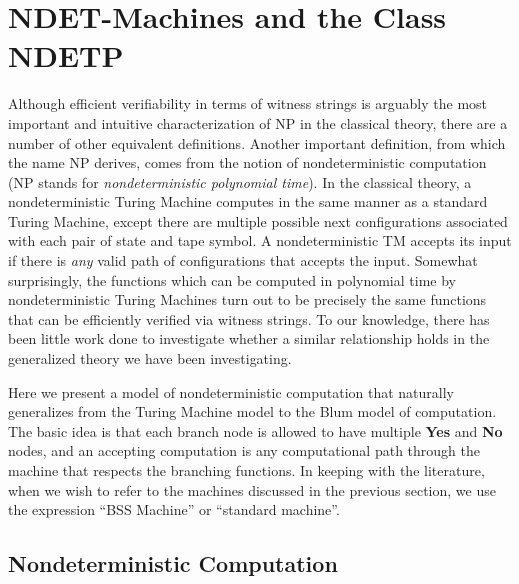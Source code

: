 \chapter{NDET-Machines and the Class NDETP}

Although efficient verifiability in terms of witness strings is arguably
the most important and intuitive characterization of NP in the
classical theory, there are a number of other equivalent definitions.
Another important definition, from which the name NP derives, comes
from the notion of nondeterministic computation (NP stands for
\emph{nondeterministic polynomial time}).  In the classical theory, a
nondeterministic Turing Machine computes in the same manner as a
standard Turing Machine, except there are multiple possible next
configurations associated with each pair of state and tape symbol.  A
nondeterministic TM accepts its input  if
there is \emph{any} valid path of configurations that accepts the
input.  Somewhat surprisingly, the functions which can be computed in
polynomial time by nondeterministic Turing Machines turn out to be
precisely the same functions that can be efficiently verified via
witness strings.  To our knowledge, there has been little work done to
investigate whether a similar relationship holds in the generalized
theory we have been investigating.

Here we present a model of nondeterministic computation that naturally
generalizes from the Turing Machine model to the Blum model of
computation.  The basic idea is that each branch node is allowed to
have multiple \textbf{Yes} and \textbf{No} nodes, and an accepting
computation is any computational path through the machine that
respects the branching functions.  In keeping with the literature,
when we wish to refer to the machines discussed in the previous
section, we use the expression ``BSS Machine'' or ``standard
machine''.

\section{Nondeterministic Computation}

